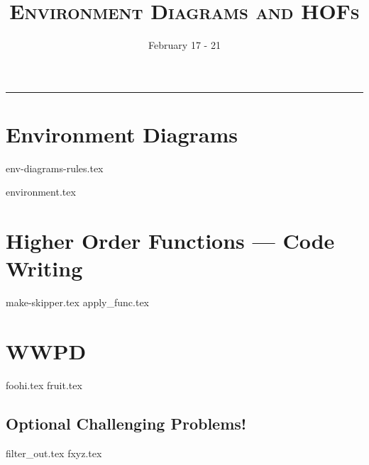 \documentclass{exam}
\title{\textsc{Environment Diagrams and HOFs}}
\date{February 17 - 21}
\begin{document}
\maketitle
\rule{\textwidth}{0.15em}
\fontsize{12}{15}\selectfont



\vspace{-1em}
\section{Environment Diagrams}
{env-diagrams-rules.tex}
\newpage
\begin{questions}
{environment.tex}

\end{questions}

\newpage
\section{Higher Order Functions — Code Writing}
\begin{questions}
{make-skipper.tex}
{apply_func.tex}
\end{questions}

\newpage
\section{WWPD}
\begin{questions}
{foohi.tex}
{fruit.tex}
\end{questions}

\newpage
\begin{questions}
\section{Optional Challenging Problems!}
{filter_out.tex}
{fxyz.tex}
\end{questions}
\end{document}

